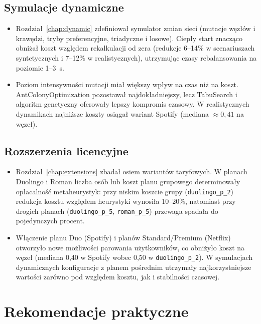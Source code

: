 \subsection*{Symulacje dynamiczne}
\begin{itemize}
  \item Rozdział~\ref{chap:dynamic} zdefiniował symulator zmian sieci (mutacje węzłów i krawędzi, tryby preferencyjne, triadyczne i losowe). Ciepły start znacząco obniżał koszt względem rekalkulacji od zera (redukcje 6--14\% w scenariuszach syntetycznych i 7--12\% w realistycznych), utrzymując czasy rebalansowania na poziomie 1--3~s.
  \item Poziom intensywności mutacji miał większy wpływ na czas niż na koszt. AntColonyOptimization pozostawał najdokładniejszy, lecz TabuSearch i algoritm genetyczny oferowały lepszy kompromis czasowy. W realistycznych dynamikach najniższe koszty osiągał wariant Spotify (mediana $\approx0{,}41$ na węzeł).
\end{itemize}

\subsection*{Rozszerzenia licencyjne}
\begin{itemize}
  \item Rozdział~\ref{chap:extensions} zbadał osiem wariantów taryfowych. W planach Duolingo i Roman liczba osób lub koszt planu grupowego determinowały opłacalność metaheurystyk: przy niskim koszcie grupy (\texttt{duolingo\_p\_2}) redukcja kosztu względem heurystyki wynosiła 10--20\%, natomiast przy drogich planach (\texttt{duolingo\_p\_5}, \texttt{roman\_p\_5}) przewaga spadała do pojedynczych procent.
  \item Włączenie planu Duo (Spotify) i planów Standard/Premium (Netflix) otworzyło nowe możliwości parowania użytkowników, co obniżyło koszt na węzeł (mediana 0,40 w Spotify wobec 0,50 w \texttt{duolingo\_p\_2}). W symulacjach dynamicznych konfiguracje z planem pośrednim utrzymały najkorzystniejsze wartości zarówno pod względem kosztu, jak i stabilności czasowej.
\end{itemize}

\section{Rekomendacje praktyczne}

